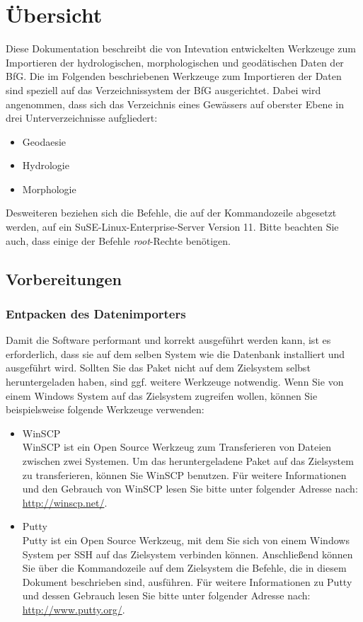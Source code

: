 \section{Übersicht}

Diese Dokumentation beschreibt die von Intevation entwickelten Werkzeuge zum
Importieren der hydrologischen, morphologischen und geodätischen Daten der BfG.
Die im Folgenden beschriebenen Werkzeuge zum Importieren der Daten sind speziell auf das Verzeichnissystem der BfG ausgerichtet.
Dabei wird angenommen, dass sich das Verzeichnis eines Gewässers auf oberster
Ebene in drei Unterverzeichnisse aufgliedert:

\begin{itemize}
    \item Geodaesie
    \item Hydrologie
    \item Morphologie
\end{itemize}

Desweiteren beziehen sich die Befehle, die auf der Kommandozeile abgesetzt
werden, auf ein SuSE-Linux-Enterprise-Server Version 11. Bitte beachten Sie
auch, dass einige der Befehle \textit{root}-Rechte benötigen.

\subsection{Vorbereitungen}

\subsubsection{Entpacken des Datenimporters}

Damit die Software performant und korrekt ausgeführt werden kann, ist es
erforderlich, dass sie auf dem selben System wie die Datenbank installiert
und ausgeführt wird.
Sollten Sie das Paket nicht auf dem
Zielsystem selbst heruntergeladen haben, sind ggf. weitere Werkzeuge notwendig.
Wenn Sie von einem Windows System auf das Zielsystem zugreifen
wollen, können Sie beispielsweise folgende Werkzeuge verwenden:

\begin{itemize}
\item WinSCP \\
WinSCP ist ein Open Source Werkzeug zum Transferieren von Dateien zwischen zwei
Systemen. Um das heruntergeladene Paket auf das Zielsystem zu transferieren,
können Sie WinSCP benutzen. Für weitere Informationen und den Gebrauch von
WinSCP lesen Sie bitte unter folgender Adresse nach:
\href{http://winscp.net/}{http://winscp.net/}.

\item Putty \\
Putty ist ein Open Source Werkzeug, mit dem Sie sich von einem Windows System
per SSH auf das Zielsystem verbinden können. Anschließend können Sie über die
Kommandozeile auf dem Zielsystem die Befehle, die in diesem Dokument beschrieben
sind, ausführen. Für weitere Informationen zu Putty und dessen Gebrauch lesen
Sie bitte unter folgender Adresse nach: \href{http://www.putty.org/}
{http://www.putty.org/}.
\end{itemize}

